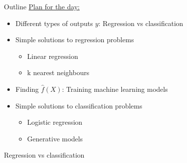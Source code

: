 \documentclass[10pt]{beamer}
\begin{document}
    \begin{frame}[t]{Outline}
        \underline{Plan for the day:}
        \begin{itemize}
            \item<2-> Different types of outputs $y$: Regression vs classification
            \item<3-> Simple solutions to regression problems
            \begin{itemize}
                \item<4-> Linear regression
                \item<4-> k nearest neighbours
            \end{itemize}
            \item<4-> Finding $\hat{f}(X)$: Training machine learning models
            \item<5-> Simple solutions to classification problems
            \begin{itemize}
                \item<6-> Logistic regression
                \item<6-> Generative models
            \end{itemize}
        \end{itemize}
    \end{frame}

    \begin{frame}{Regression vs classification}

    \end{frame}
\end{document}
